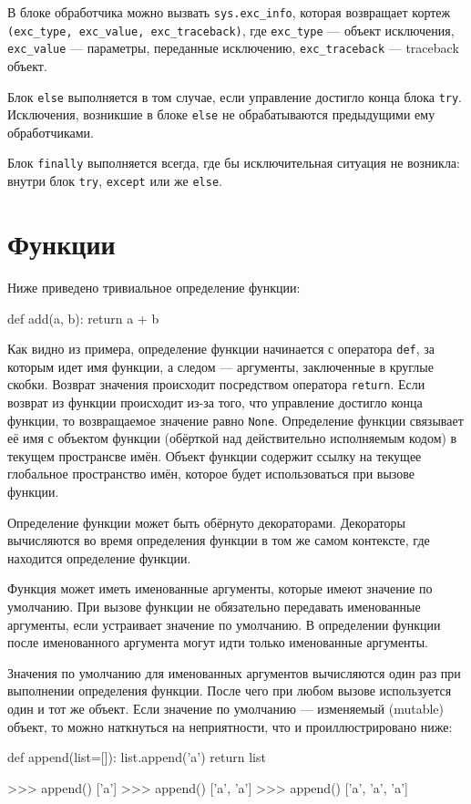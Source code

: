 В блоке обработчика можно вызвать \lstinline{sys.exc_info}, которая возвращает кортеж \lstinline{(exc_type, exc_value, exc_traceback)}, где \lstinline{exc_type} --- объект исключения, \lstinline{exc_value} --- параметры, переданные исключению, \lstinline{exc_traceback} --- traceback объект.

Блок \lstinline{else} выполняется в том случае, если управление достигло конца блока \lstinline{try}. Исключения, возникшие в блоке \lstinline{else} не обрабатываются предыдущими ему обработчиками.

Блок \lstinline{finally} выполняется всегда, где бы исключительная ситуация не возникла: внутри блок \lstinline{try}, \lstinline{except} или же \lstinline{else}.

\section{Функции}
Ниже приведено тривиальное определение функции:
\begin{pylst}{}{}
def add(a, b):
    return a + b
\end{pylst}

Как видно из примера, определение функции начинается с оператора \lstinline{def}, за которым идет имя функции, а следом --- аргументы, заключенные в круглые скобки. Возврат значения происходит посредством оператора \lstinline{return}. Если возврат из функции происходит из-за того, что управление достигло конца функции, то возвращаемое значение равно \lstinline{None}. Определение функции связывает её имя с объектом функции (обёрткой над действительно исполняемым кодом) в текущем пространсве имён. Объект функции содержит ссылку на текущее глобальное пространство имён, которое будет использоваться при вызове функции.

Определение функции может быть обёрнуто декораторами. Декораторы вычисляются во время определения функции в том же самом контексте, где находится определение функции.

Функция может иметь именованные аргументы, которые имеют значение по умолчанию. При вызове функции не обязательно передавать именованные аргументы, если устраивает значение по умолчанию. В определении функции после именованного аргумента могут идти только именованные аргументы.

Значения по умолчанию для именованных аргументов вычисляются один раз при выполнении определения функции. После чего при любом вызове используется один и тот же объект. Если значение по умолчанию --- изменяемый (mutable) объект, то можно наткнуться на неприятности, что и проиллюстрировано ниже:
\begin{pylst}{}{}
def append(list=[]):
    list.append('a')
    return list

>>> append()
['a']
>>> append()
['a', 'a']
>>> append()
['a', 'a', 'a']
\end{pylst}

